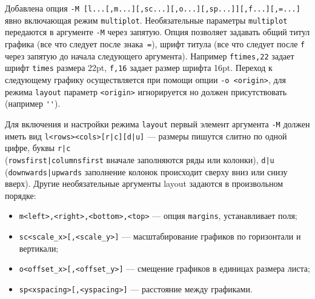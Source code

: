 \documentclass[12pt]{article}
\begin{document}
Добавлена опция \verb'-M [l...[,m...][,sc...][,o...][,sp...]][,f...][,=...]' явно включающая режим \verb'multiplot'.
Необязательные параметры \verb'multiplot' передаются в аргументе \verb'-M'  через запятую.
Опция позволяет задавать общий титул графика (все что следует после знака~\verb'='),
шрифт титула (все что следует после \verb'f' через запятую до начала следующего аргумента).
Например \verb'ftimes,22' задает шрифт \verb'times' размера 22pt,  \verb'f,16' задает размер шрифта 16pt.
Переход к следующему графику осуществляется при помощи опции \verb'-o <origin>', для 
режима \verb'layout' параметр  \verb'<origin>' игнорируется но должен присутствовать (например \verb|''|). 

Для включения и настройки режима \verb'layout' первый элемент аргумента \verb'-M' должен иметь вид
\verb'l<rows><cols>[r|с][d|u]' ---  размеры пишутся слитно по одной 
цифре, буквы \verb'r|с'\\ (\verb'rowsfirst|columnsfirst' вначале заполняются ряды или колонки),
\verb'd|u' (\verb'downwards|upwards' заполнение колонок происходит сверху вниз или снизу вверх).
Другие необязательные аргументы layout задаются в произвольном порядке:
\begin{itemize}
\item  \verb'm<left>,<right>,<bottom>,<top>' --- опция \verb'margins', устанавливает поля;
\item  \verb'sс<scale_x>[,<scale_y>]' --- масштабирование графиков по горизонтали и вертикали;
\item  \verb'o<offset_x>[,<offset_y>]' --- смещение графиков в единицах размера листа;
\item  \verb'sp<xspacing>[,<yspacing>]' --- расстояние между графиками.
\end{itemize}
\end{document}
